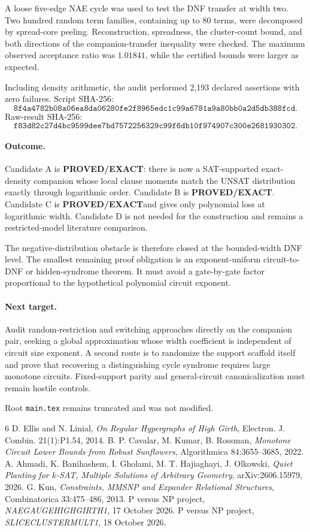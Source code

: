 \documentclass[11pt]{article}
\newcommand{\EXACT}{\textbf{PROVED/EXACT}}
\begin{document}
A loose five-edge NAE cycle was used to test the DNF transfer at width two. Two hundred random term families, containing up to 80 terms, were decomposed by spread-core peeling. Reconstruction, spreadness, the cluster-count bound, and both directions of the companion-transfer inequality were checked. The maximum observed acceptance ratio was $1.01841$, while the certified bounds were larger as expected.

Including density arithmetic, the audit performed 2,193 declared assertions with zero failures. Script SHA-256:
\[
\texttt{8f4a4782b08a06ea8da06280fe2f8965edc1c99a6781a9a80bb0a2d5db388fcd}.
\]
Raw-result SHA-256:
\[
\texttt{f83d82c27d4bc9599dee7bd7572256329c99f6db10f974907c300e2681930302}.
\]

\paragraph{Outcome.}
Candidate A is \EXACT: there is now a SAT-supported exact-density companion whose local clause moments match the UNSAT distribution exactly through logarithmic order. Candidate B is \EXACT. Candidate C is \EXACT and gives only polynomial loss at logarithmic width. Candidate D is not needed for the construction and remains a restricted-model literature comparison.

The negative-distribution obstacle is therefore closed at the bounded-width DNF level. The smallest remaining proof obligation is an exponent-uniform circuit-to-DNF or hidden-syndrome theorem. It must avoid a gate-by-gate factor proportional to the hypothetical polynomial circuit exponent.

\paragraph{Next target.}
Audit random-restriction and switching approaches directly on the companion pair, seeking a global approximation whose width coefficient is independent of circuit size exponent. A second route is to randomize the support scaffold itself and prove that recovering a distinguishing cycle syndrome requires large monotone circuits. Fixed-support parity and general-circuit canonicalization must remain hostile controls.

Root \texttt{main.tex} remains truncated and was not modified.

\begin{thebibliography}{6}
 D. Ellis and N. Linial, \emph{On Regular Hypergraphs of High Girth}, Electron. J. Combin. 21(1):P1.54, 2014.
 B. P. Cavalar, M. Kumar, B. Rossman, \emph{Monotone Circuit Lower Bounds from Robust Sunflowers}, Algorithmica 84:3655--3685, 2022.
 A. Ahmadi, K. Banihashem, I. Gholami, M. T. Hajiaghayi, J. Olkowski, \emph{Quiet Planting for $k$-SAT, Multiple Solutions of Arbitrary Geometry}, arXiv:2606.15979, 2026.
 G. Kun, \emph{Constraints, MMSNP and Expander Relational Structures}, Combinatorica 33:475--486, 2013.
 P versus NP project, \emph{NAEGAUGEHIGHGIRTH1}, 17 October 2026.
 P versus NP project, \emph{SLICECLUSTERMULT1}, 18 October 2026.
\end{thebibliography}
\end{document}
